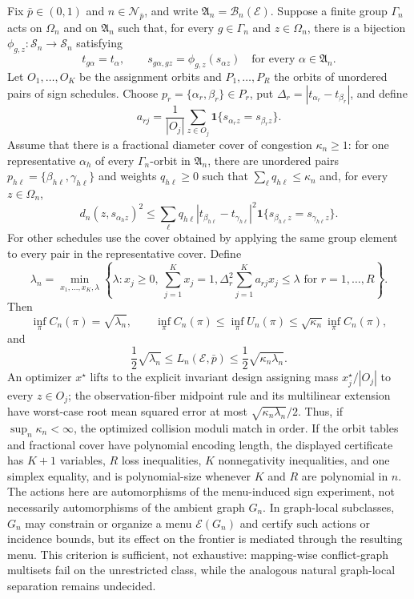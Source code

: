 Fix \(\bar p\in(0,1)\) and \(n\in\mathcal N_{\bar p}\), and write \(\mathfrak A_n=\mathcal B_n(\mathcal E)\). Suppose a finite group \(\Gamma_n\) acts on \(\Omega_n\) and on \(\mathfrak A_n\) such that, for every \(g\in\Gamma_n\) and \(z\in\Omega_n\), there is a bijection \(\phi_{g,z}:\mathcal S_n\to\mathcal S_n\) satisfying
\[
 t_{g\alpha}=t_\alpha,
 \qquad
 s_{g\alpha,gz}=\phi_{g,z}(s_{\alpha z})
 \quad\text{for every }\alpha\in\mathfrak A_n.
\]
Let \(O_1,\ldots,O_K\) be the assignment orbits and \(P_1,\ldots,P_R\) the orbits of unordered pairs of sign schedules. Choose \(p_r=\{\alpha_r,\beta_r\}\in P_r\), put \(\Delta_r=|t_{\alpha_r}-t_{\beta_r}|\), and define
\[
 a_{rj}=\frac{1}{|O_j|}\sum_{z\in O_j}
 \mathbf 1\{s_{\alpha_r z}=s_{\beta_r z}\}.
\]
Assume that there is a fractional diameter cover of congestion \(\kappa_n\ge1\): for one representative \(\alpha_h\) of every \(\Gamma_n\)-orbit in \(\mathfrak A_n\), there are unordered pairs \(p_{h\ell}=\{\beta_{h\ell},\gamma_{h\ell}\}\) and weights \(q_{h\ell}\ge0\) such that \(\sum_\ell q_{h\ell}\le\kappa_n\) and, for every \(z\in\Omega_n\),
\[
 d_n(z,s_{\alpha_h z})^2
 \le
 \sum_\ell q_{h\ell}
 |t_{\beta_{h\ell}}-t_{\gamma_{h\ell}}|^2
 \mathbf 1\{s_{\beta_{h\ell}z}=s_{\gamma_{h\ell}z}\}.
\]
For other schedules use the cover obtained by applying the same group element to every pair in the representative cover. Define
\[
 \lambda_n=\min_{x_1,\ldots,x_K,\lambda}
 \left\{\lambda:
 x_j\ge0,\ \sum_{j=1}^Kx_j=1,
 \Delta_r^2\sum_{j=1}^K a_{rj}x_j\le\lambda
 \text{ for }r=1,\ldots,R\right\}.
\]
Then
\[
 \inf_\pi C_n(\pi)=\sqrt{\lambda_n},
 \qquad
 \inf_\pi C_n(\pi)
 \le \inf_\pi U_n(\pi)
 \le \sqrt{\kappa_n}\inf_\pi C_n(\pi),
\]
and
\[
 \frac12\sqrt{\lambda_n}
 \le L_n(\mathcal E,\bar p)
 \le \frac12\sqrt{\kappa_n\lambda_n}.
\]
An optimizer \(x^\star\) lifts to the explicit invariant design assigning mass \(x_j^\star/|O_j|\) to every \(z\in O_j\); the observation-fiber midpoint rule and its multilinear extension have worst-case root mean squared error at most \(\sqrt{\kappa_n\lambda_n}/2\). Thus, if \(\sup_n\kappa_n<\infty\), the optimized collision moduli match in order. If the orbit tables and fractional cover have polynomial encoding length, the displayed certificate has \(K+1\) variables, \(R\) loss inequalities, \(K\) nonnegativity inequalities, and one simplex equality, and is polynomial-size whenever \(K\) and \(R\) are polynomial in \(n\). The actions here are automorphisms of the menu-induced sign experiment, not necessarily automorphisms of the ambient graph \(G_n\). In graph-local subclasses, \(G_n\) may constrain or organize a menu \(\mathcal E(G_n)\) and certify such actions or incidence bounds, but its effect on the frontier is mediated through the resulting menu. This criterion is sufficient, not exhaustive: mapping-wise conflict-graph multisets fail on the unrestricted class, while the analogous natural graph-local separation remains undecided.